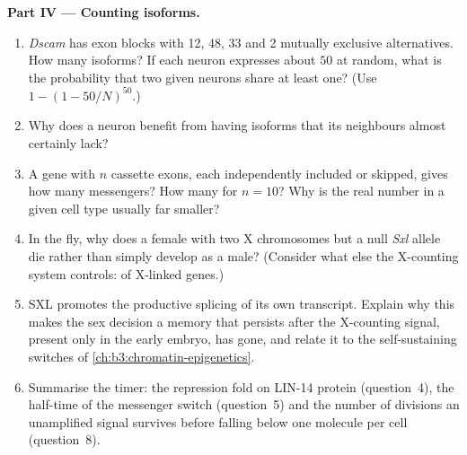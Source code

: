 \begin{problem}
\medskip
\noindent\textbf{Part IV --- Counting isoforms.}
\begin{enumerate}[resume]
  \item \emph{Dscam} has exon blocks with 12, 48, 33 and 2 mutually
        exclusive alternatives. How many isoforms? If each neuron
        expresses about $50$ at random, what is the probability that
        two given neurons share at least one? (Use $1 - (1 -
        50/N)^{50}$.)
  \item Why does a neuron benefit from having isoforms that its
        neighbours almost certainly lack?
  \item A gene with $n$ cassette exons, each independently included
        or skipped, gives how many messengers? How many for $n = 10$?
        Why is the real number in a given cell type usually far
        smaller?
  \item In the fly, why does a female with two X chromosomes but a
        null \emph{Sxl} allele die rather than simply develop as a
        male? (Consider what else the X-counting system controls:
         of X-linked genes.)
  \item SXL promotes the productive splicing of its own transcript.
        Explain why this makes the sex decision a memory that persists
        after the X-counting signal, present only in the early embryo,
        has gone, and relate it to the self-sustaining switches of
        \cref{ch:b3:chromatin-epigenetics}.
  \item Summarise the timer: the repression fold on LIN-14 protein
        (question~4), the half-time of the messenger switch
        (question~5) and the number of divisions an unamplified
        signal survives before falling below one molecule per cell
        (question~8).
\end{enumerate}
\end{problem}
